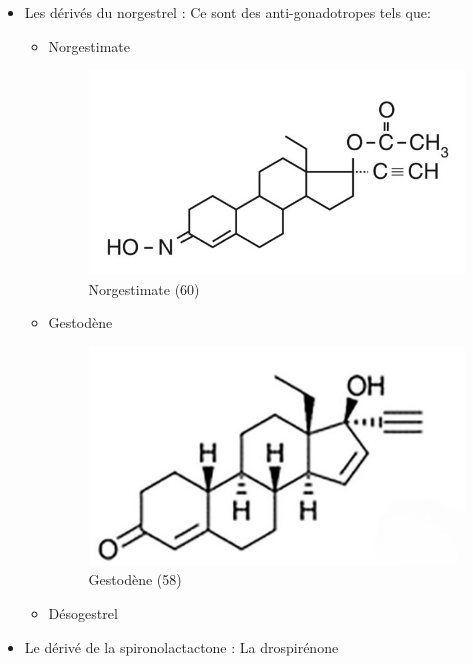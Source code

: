 \begin{itemize}[label={$\bullet$}, align=right]
  \item Les dérivés du norgestrel : Ce sont des anti-gonadotropes tels que:
  \begin{itemize}[label={$\circ$}] 
    \item Norgestimate 
    \begin{figure}[H]
      \centering
      \includegraphics{Images/fig_29.jpg}
      \caption{Norgestimate (60)}
    \end{figure}
    \item Gestodène 
    \begin{figure}[H]
      \centering
      \includegraphics{Images/fig_30.jpg}
      \caption{Gestodène (58)}
    \end{figure}
    \item Désogestrel
  \end{itemize}
  \item Le dérivé de la spironolactactone : La drospirénone 
  \begin{figure}[H]
    \centering

\end{figure}
\end{itemize}
